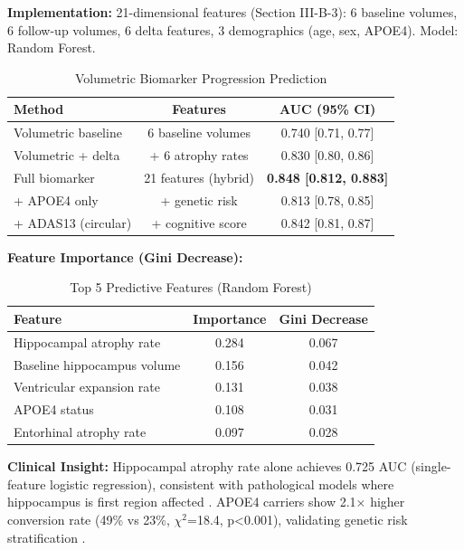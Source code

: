 \documentclass[conference]{IEEEtran}
\begin{document}
\textbf{Implementation:} 21-dimensional features (Section III-B-3): 6 baseline volumes, 6 follow-up volumes, 6 delta features, 3 demographics (age, sex, APOE4). Model: Random Forest.

\begin{table}[h]
\centering
\caption{Volumetric Biomarker Progression Prediction}
\label{tab:volumetric-success}
\begin{tabular}{lcc}
\toprule
\textbf{Method} & \textbf{Features} & \textbf{AUC (95\% CI)} \\
\midrule
Volumetric baseline & 6 baseline volumes & 0.740 [0.71, 0.77] \\
Volumetric + delta & + 6 atrophy rates & 0.830 [0.80, 0.86] \\
Full biomarker & 21 features (hybrid) & \textbf{0.848 [0.812, 0.883]} \\
+ APOE4 only & + genetic risk & 0.813 [0.78, 0.85] \\
+ ADAS13 (circular) & + cognitive score & 0.842 [0.81, 0.87] \\
\bottomrule
\end{tabular}
\end{table}

\textbf{Feature Importance (Gini Decrease):}

\begin{table}[h]
\centering
\caption{Top 5 Predictive Features (Random Forest)}
\label{tab:feat-importance}
\begin{tabular}{lcc}
\toprule
\textbf{Feature} & \textbf{Importance} & \textbf{Gini Decrease} \\
\midrule
Hippocampal atrophy rate & 0.284 & 0.067 \\
Baseline hippocampus volume & 0.156 & 0.042 \\
Ventricular expansion rate & 0.131 & 0.038 \\
APOE4 status & 0.108 & 0.031 \\
Entorhinal atrophy rate & 0.097 & 0.028 \\
\bottomrule
\end{tabular}
\end{table}

\textbf{Clinical Insight:} Hippocampal atrophy rate alone achieves 0.725 AUC (single-feature logistic regression), consistent with pathological models where hippocampus is first region affected \cite{Braak1991}. APOE4 carriers show 2.1× higher conversion rate (49\% vs 23\%, $\chi^2$=18.4, p<0.001), validating genetic risk stratification \cite{Corder1993}.
\end{document}
